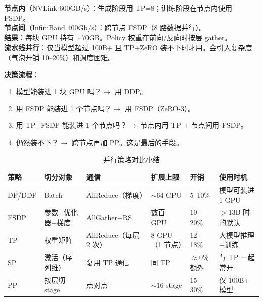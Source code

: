 \begin{keybox}[生产配方：64 块 A100-80GB（8 节点）上的 70B]
\textbf{节点内}（NVLink 600GB/s）：生成阶段用 TP=8；训练阶段在节点内使用 FSDP。\\

\textbf{节点间}（InfiniBand 400Gb/s）：跨节点 FSDP（8 路数据并行）。\\

\textbf{结果}：每块 GPU 持有 $\sim$70GB。Policy 权重在前向/反向时按层 gather。\\

\textbf{流水线并行}：仅当模型超过 100B+ 且 TP+ZeRO 装不下时才用。会引入复杂度（气泡开销 10--20\%）和调度困难。

\textbf{决策流程}：

\begin{enumerate}
  \item 模型能装进 1 块 GPU 吗？$\rightarrow$ 用 DDP。
  \item 用 FSDP 能装进 1 个节点吗？$\rightarrow$ 用 FSDP（ZeRO-3）。
  \item 用 TP+FSDP 能装进 1 个节点吗？$\rightarrow$ 节点内用 TP + 节点间用 FSDP。
  \item 仍然装不下？$\rightarrow$ 跨节点再加 PP。这是最后的手段。
\end{enumerate}
\end{keybox}

\begin{table}[ht!]
\centering
\caption{并行策略对比小结}
{\footnotesize
\noindent\begin{tabularx}{\linewidth}{@{}l l Z{1.06} l l Z{0.94}@{}}
\toprule
\textbf{策略} & \textbf{切分对象} & \textbf{通信} & \textbf{扩展上限} & \textbf{开销} & \textbf{使用时机} \\
\midrule
DP/DDP & Batch & AllReduce（梯度） & $\sim$64 GPU & 5--10\% & 模型可装进 1 GPU \\
FSDP & 参数+优化器+梯度 & AllGather+RS & 数百 GPU & 10--20\% & $>$13B 时的默认 \\
TP & 权重矩阵 & AllReduce（每层 2 次） & 8 GPU（1 节点） & 12--18\% & 大模型推理+训练 \\
SP & 激活（序列维） & 复用 TP 通信 & 同 TP & $\approx$0\% 额外 & 与 TP 一起常开 \\
PP & 按层切 stage & 点对点 & $\sim$16 stage & 15--30\% & 仅 100B+ 模型 \\
\bottomrule
\end{tabularx}
}
\end{table}

